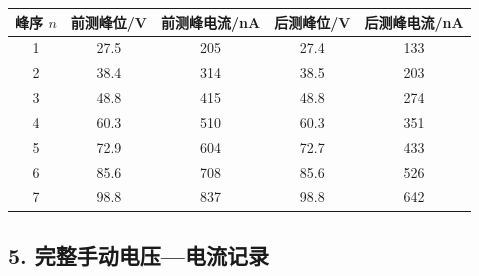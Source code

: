 \begin{center}
\begin{minipage}{\linewidth}
\centering

{\small
\setlength{\tabcolsep}{6pt}
\renewcommand{\arraystretch}{1.15}
\begin{tabular}{ccccc}
\toprule

峰序 $n$ & 前测峰位/V & 前测峰电流/nA & 后测峰位/V & 后测峰电流/nA \\

\midrule

1 & 27.5 & 205 & 27.4 & 133 \\

2 & 38.4 & 314 & 38.5 & 203 \\

3 & 48.8 & 415 & 48.8 & 274 \\

4 & 60.3 & 510 & 60.3 & 351 \\

5 & 72.9 & 604 & 72.7 & 433 \\

6 & 85.6 & 708 & 85.6 & 526 \\

7 & 98.8 & 837 & 98.8 & 642 \\

\bottomrule

\end{tabular}
}

\end{minipage}
\end{center}

\subsection*{5. 完整手动电压—电流记录}

\begingroup
{}

